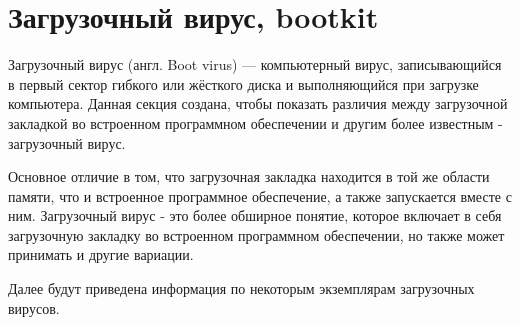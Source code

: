 \section{Загрузочный вирус, bootkit}
Загрузочный вирус (англ. Boot virus) — компьютерный вирус, записывающийся в первый сектор гибкого или жёсткого диска и выполняющийся при загрузке компьютера. \cite{wiki:bootkit}
Данная секция создана, 
	чтобы показать различия между загрузочной закладкой во встроенном программном обеспечении и другим более известным - загрузочный вирус.

Основное отличие в том,
	что загрузочная закладка находится в той же области памяти,
		что и встроенное программное обеспечение,
		а также запускается вместе с ним.
Загрузочный вирус - это более обширное понятие, которое включает в себя загрузочную закладку во встроенном программном обеспечении, но также может принимать и другие вариации.

Далее будут приведена информация по некоторым экземплярам загрузочных вирусов.



